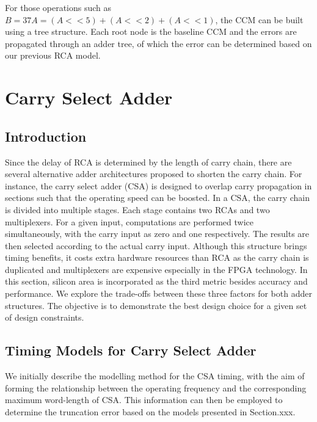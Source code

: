 \documentclass[journal]{IEEEtran}
\begin{document}
For those operations such as $B=37A=(A<<5)+(A<<2)+(A<<1)$, the CCM can be built using a tree structure. Each root node is the baseline CCM and the errors are propagated through an adder tree, of which the error can be determined based on our previous RCA model.

\section{Carry Select Adder}
\subsection{Introduction}
Since the delay of RCA is determined by the length of carry chain, there are several alternative adder architectures proposed to shorten the carry chain. For instance, the carry select adder (CSA) is designed to overlap carry propagation in sections such that the operating speed can be boosted. In a CSA, the carry chain is divided into multiple stages. Each stage contains two RCAs and two multiplexers. For a given input, computations are performed twice simultaneously, with the carry input as zero and one respectively. The results are then selected according to the actual carry input. Although this structure brings timing benefits, it costs extra hardware resources than RCA as the carry chain is duplicated and multiplexers are expensive especially in the FPGA technology. In this section, silicon area is incorporated as the third metric besides accuracy and performance. We explore the trade-offs between these three factors for both adder structures. The objective is to demonstrate the best design choice for a given set of design constraints.



\subsection{Timing Models for Carry Select Adder}
We initially describe the modelling method for the CSA timing, with the aim of forming the relationship between the operating frequency and the corresponding maximum word-length of CSA. This information can then be employed to determine the truncation error based on the models presented in Section.xxx.
\end{document}
